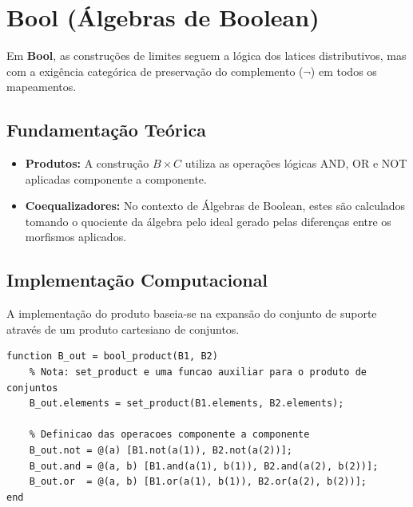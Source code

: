 \section{Bool (Álgebras de Boolean)}

Em \textbf{Bool}, as construções de limites seguem a lógica dos latices distributivos, mas com a exigência categórica de preservação do complemento ($\neg$) em todos os mapeamentos.

\subsection{Fundamentação Teórica}
\begin{itemize}
    \item \textbf{Produtos:} A construção $B \times C$ utiliza as operações lógicas AND, OR e NOT aplicadas componente a componente.
    \item \textbf{Coequalizadores:} No contexto de Álgebras de Boolean, estes são calculados tomando o quociente da álgebra pelo ideal gerado pelas diferenças entre os morfismos aplicados.
\end{itemize}

\subsection{Implementação Computacional}
A implementação do produto baseia-se na expansão do conjunto de suporte através de um produto cartesiano de conjuntos.

\begin{lstlisting}[caption={Produto em Álgebras de Boolean}]
function B_out = bool_product(B1, B2)
    % Nota: set_product e uma funcao auxiliar para o produto de conjuntos
    B_out.elements = set_product(B1.elements, B2.elements);
    
    % Definicao das operacoes componente a componente
    B_out.not = @(a) [B1.not(a(1)), B2.not(a(2))];
    B_out.and = @(a, b) [B1.and(a(1), b(1)), B2.and(a(2), b(2))];
    B_out.or  = @(a, b) [B1.or(a(1), b(1)), B2.or(a(2), b(2))];
end
\end{lstlisting}